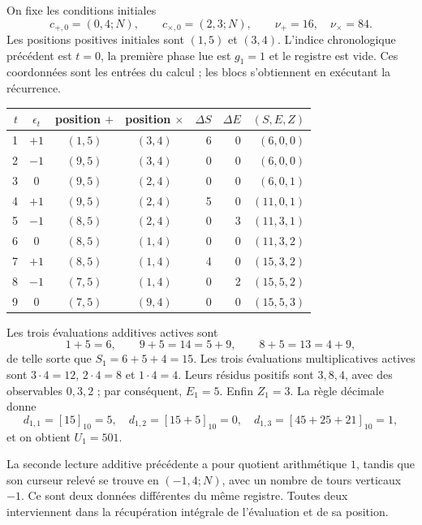 On fixe les conditions initiales
\[
 c_{+,0}=(0,4;N),\qquad c_{\times,0}=(2,3;N),
 \qquad \nu_+=16,\quad\nu_\times=84.
\]
Les positions positives initiales sont \((1,5)\) et \((3,4)\). L'indice
chronologique précédent est \(t=0\), la première phase lue est \(g_1=1\) et le
registre est vide. Ces coordonnées sont les entrées
du calcul ; les blocs s'obtiennent en exécutant la récurrence.

\begin{tablacompleta}[htbp]
\caption{Première fenêtre : lectures précédentes et accumulation active.}
\label{tpk:tabla-501}
\small
\begin{tabular}{@{}rcccrrr@{}}
\toprule
\(t\)&\(\epsilon_t\)&position \(+\)&position \(\times\)&
\(\Delta S\)&\(\Delta E\)&\((S,E,Z)\)\\
\midrule
1&\(+1\)&\((1,5)\)&\((3,4)\)&6&0&\((6,0,0)\)\\
2&\(-1\)&\((9,5)\)&\((3,4)\)&0&0&\((6,0,0)\)\\
3&0&\((9,5)\)&\((2,4)\)&0&0&\((6,0,1)\)\\
4&\(+1\)&\((9,5)\)&\((2,4)\)&5&0&\((11,0,1)\)\\
5&\(-1\)&\((8,5)\)&\((2,4)\)&0&3&\((11,3,1)\)\\
6&0&\((8,5)\)&\((1,4)\)&0&0&\((11,3,2)\)\\
7&\(+1\)&\((8,5)\)&\((1,4)\)&4&0&\((15,3,2)\)\\
8&\(-1\)&\((7,5)\)&\((1,4)\)&0&2&\((15,5,2)\)\\
9&0&\((7,5)\)&\((9,4)\)&0&0&\((15,5,3)\)\\
\bottomrule
\end{tabular}
\end{tablacompleta}

Les trois évaluations additives actives sont
\[
 1+5=6,\qquad9+5=14=5+9,\qquad8+5=13=4+9,
\]
de telle sorte que \(S_1=6+5+4=15\). Les trois évaluations multiplicatives actives
sont \(3\cdot4=12\), \(2\cdot4=8\) et \(1\cdot4=4\). Leurs résidus
positifs sont \(3,8,4\), avec des observables \(0,3,2\) ; par conséquent,
\(E_1=5\). Enfin \(Z_1=3\). La règle décimale donne
\[
 d_{1,1}=[15]_{10}=5,\quad
 d_{1,2}=[15+5]_{10}=0,\quad
 d_{1,3}=[45+25+21]_{10}=1,
\]
et on obtient \(U_1=501\).

La seconde lecture additive précédente a pour quotient arithmétique \(1\),
tandis que son curseur relevé se trouve en \((-1,4;N)\), avec un nombre de tours
verticaux \(-1\). Ce sont deux données différentes du même registre. Toutes deux
interviennent dans la récupération intégrale de l'évaluation et de sa position.

